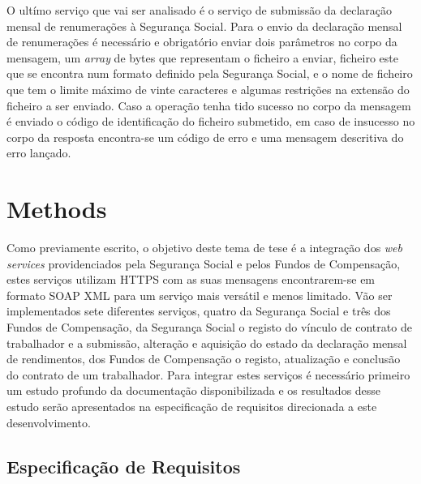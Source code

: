 \documentclass[sigplan]{acmart}
\begin{document}
O ultímo serviço que vai ser analisado é o serviço de submissão da declaração mensal de renumerações à Segurança Social. Para o envio da declaração mensal de renumerações é necessário e obrigatório enviar dois parâmetros no corpo da mensagem, um \textit{array} de bytes que representam o ficheiro a enviar, ficheiro este que se encontra num formato definido pela Segurança Social, e o nome de ficheiro que tem o limite máximo de vinte caracteres e algumas restrições na extensão do ficheiro a ser enviado. Caso a operação tenha tido sucesso no corpo da mensagem é enviado o código de identificação do ficheiro submetido, em caso de insucesso no corpo da resposta encontra-se um código de erro e uma mensagem descritiva do erro lançado.

\section{Methods} \label{sec:methods}

Como previamente escrito, o objetivo deste tema de tese é a integração dos \textit{web services} providenciados pela Segurança Social e pelos Fundos de Compensação, estes serviços utilizam HTTPS com as suas mensagens encontrarem-se em formato SOAP XML para um serviço mais versátil e menos limitado. Vão ser implementados sete diferentes serviços, quatro da Segurança Social e três dos Fundos de Compensação, da Segurança Social o registo do vínculo de contrato de trabalhador e a submissão, alteração e aquisição do estado da declaração mensal de rendimentos, dos Fundos de Compensação o registo, atualização e conclusão do contrato de um trabalhador. Para integrar estes serviços é necessário primeiro um estudo profundo da documentação disponibilizada e os resultados desse estudo serão apresentados na especificação de requisitos direcionada a este desenvolvimento.

\subsection{Especificação de Requisitos}
\end{document}
